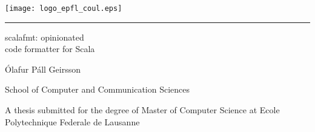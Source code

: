 
%        




\newcommand{\logoepfl}[0]{
  \begin{center}
    \texttt{[image: logo\_epfl\_coul.eps]}
  \end{center}
  \vspace{0.3cm}
  \hrule
}
\newcommand{\logolasec}[0]{
  \vspace{1cm}
  \hrule
  \begin{center}
    \texttt{[image: logo\_lasec\_coul.eps]}
  \end{center}
}
\newcommand{\project}[1]{
  \begin{center}
    \large{#1}
  \end{center}
  \vspace{1cm}
}
\newcommand{\department}[1]{
  \begin{center}
    \large{#1}
  \end{center}
}
\newcommand{\supervisor}[3]{
  \begin{center}
    \begin{normalsize}{
        \bf #1}\\#2\\#3
    \end{normalsize}
  \end{center}
}
\renewcommand{\author}[1]{
  \begin{center}
    \Large{#1}
  \end{center}
  \vspace{0.5cm}
}
\renewcommand{\title}[1]{
  \vspace{3cm}
  \begin{center}
    \huge{#1}
  \end{center}
  \vspace{1.7cm}
}
\renewcommand{\date}[2]{
  \begin{center}
    \normalsize{#1 #2}
  \end{center}
  \vspace{0.5cm}
}


\thispagestyle{empty}


  \logoepfl

  \title{scalafmt: opinionated \\ code formatter for Scala}

  \author{Ólafur Páll Geirsson}
  \department{School of Computer and Communication Sciences}
  \project{A thesis submitted for the degree of Master of Computer Science at Ecole Polytechnique Federale de Lausanne}

